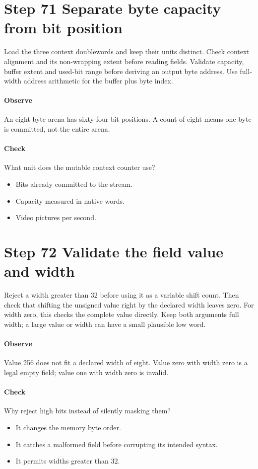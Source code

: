 \section{Step 71 Separate byte capacity from bit position}\label{h263-writer-s01}
Load the three context doublewords and keep their units distinct. Check context
alignment and its non-wrapping extent before reading fields. Validate capacity,
buffer extent and used-bit range before deriving an output byte address. Use
full-width address arithmetic for the buffer plus byte index.

\paragraph{Observe} An eight-byte arena has sixty-four bit positions. A count
of eight means one byte is committed, not the entire arena.
\paragraph{Check} What unit does the mutable context counter use?
\begin{itemize}
  \item[A.] Bits already committed to the stream.
  \item[B.] Capacity measured in native words.
  \item[C.] Video pictures per second.
\end{itemize}

\section{Step 72 Validate the field value and width}\label{h263-writer-s02}
Reject a width greater than 32 before using it as a variable shift count. Then
check that shifting the unsigned value right by the declared width leaves zero.
For width zero, this checks the complete value directly. Keep both arguments
full width; a large value or width can have a small plausible low word.

\paragraph{Observe} Value 256 does not fit a declared width of eight. Value zero
with width zero is a legal empty field; value one with width zero is invalid.
\paragraph{Check} Why reject high bits instead of silently masking them?
\begin{itemize}
  \item[A.] It changes the memory byte order.
  \item[B.] It catches a malformed field before corrupting its intended syntax.
  \item[C.] It permits widths greater than 32.
\end{itemize}

